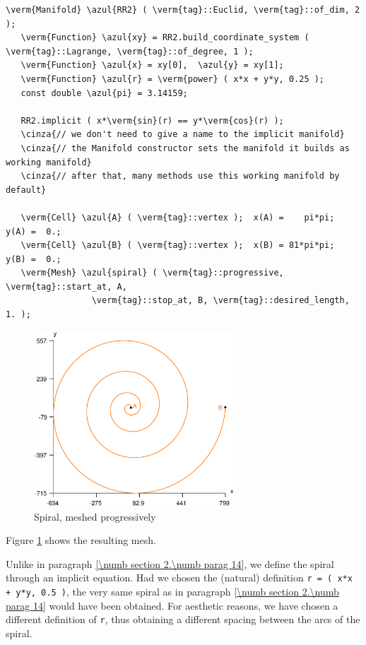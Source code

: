 \begin{Verbatim}[commandchars=\\\{\},formatcom=\small\tt,frame=single,
   label=parag-\ref{\numb section 3.\numb parag 5}.cpp,rulecolor=\color{coment},
   baselinestretch=0.94,framesep=2mm                                            ]
   \verm{Manifold} \azul{RR2} ( \verm{tag}::Euclid, \verm{tag}::of_dim, 2 );
   \verm{Function} \azul{xy} = RR2.build_coordinate_system ( \verm{tag}::Lagrange, \verm{tag}::of_degree, 1 );
   \verm{Function} \azul{x} = xy[0],  \azul{y} = xy[1];
   \verm{Function} \azul{r} = \verm{power} ( x*x + y*y, 0.25 );
   const double \azul{pi} = 3.14159;
   
   RR2.implicit ( x*\verm{sin}(r) == y*\verm{cos}(r) );
   \cinza{// we don't need to give a name to the implicit manifold}
   \cinza{// the Manifold constructor sets the manifold it builds as working manifold}
   \cinza{// after that, many methods use this working manifold by default}
   
   \verm{Cell} \azul{A} ( \verm{tag}::vertex );  x(A) =    pi*pi;   y(A) =  0.;
   \verm{Cell} \azul{B} ( \verm{tag}::vertex );  x(B) = 81*pi*pi;   y(B) =  0.;
   \verm{Mesh} \azul{spiral} ( \verm{tag}::progressive, \verm{tag}::start_at, A,
                 \verm{tag}::stop_at, B, \verm{tag}::desired_length, 1. );
\end{Verbatim}

\begin{figure} \centering
 \includegraphics[width=75mm]{spiral-prog}
  \caption{Spiral, meshed progressively}
 \label{\numb section 3.\numb fig 3}
\end{figure}

Figure \ref{\numb section 3.\numb fig 3} shows the resulting mesh.

Unlike in paragraph \ref{\numb section 2.\numb parag 14}, we define the spiral through
an implicit equation.
Had we chosen the (natural) definition {\small\tt r =  ( x*x + y*y, 0.5 )},
the very same spiral as in paragraph \ref{\numb section 2.\numb parag 14} would have been
obtained.
For aesthetic reasons, we have chosen a different definition of {\small\tt r}, thus obtaining
a different spacing between the arcs of the spiral.

